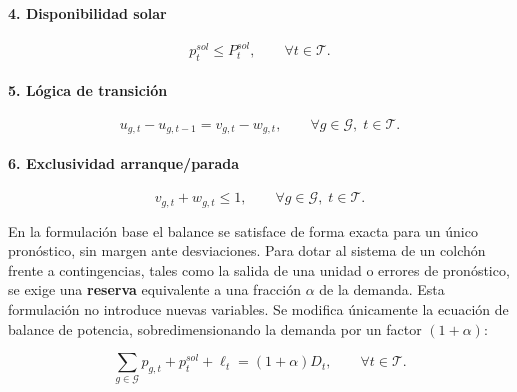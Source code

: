 \documentclass[
	spanish, %
	letterpaper, oneside
]{article}
\begin{document}
\paragraph{4. Disponibilidad solar}

\begin{equation}
    p^{sol}_t
    \leq
    P^{sol}_t,
    \qquad 
    \forall t\in\mathcal{T}.
    \label{eq:disponibilidad_solar_determinista}
\end{equation}

\paragraph{5. Lógica de transición}

\begin{equation}
    u_{g,t}-u_{g,t-1}
    =
    v_{g,t}-w_{g,t},
    \qquad 
    \forall g\in\mathcal{G},\; t\in\mathcal{T}.
    \label{eq:logica_transicion_determinista}
\end{equation}

\paragraph{6. Exclusividad arranque/parada}

\begin{equation}
    v_{g,t}+w_{g,t}
    \leq
    1,
    \qquad 
    \forall g\in\mathcal{G},\; t\in\mathcal{T}.
    \label{eq:exclusividad_arranque_parada_determinista}
\end{equation}

En la formulación base el balance se satisface de forma exacta para un único pronóstico, sin margen ante desviaciones. Para dotar al sistema de un colchón frente 
a contingencias, tales como la salida de una unidad o errores de pronóstico, se exige una \textbf{reserva} equivalente a una fracción $\alpha$ de la demanda. Esta formulación no introduce nuevas variables. Se modifica únicamente la ecuación 
de balance de potencia, sobredimensionando la demanda por un factor $(1+\alpha)$:

\begin{equation}
    \sum_{g\in\mathcal{G}} p_{g,t}
    +
    p^{sol}_t
    +
    \ell_t
    =
    (1+\alpha)D_t,
    \qquad 
    \forall t\in\mathcal{T}.
    \label{eq:balance_potencia_reserva_implicita}
\end{equation}
\end{document}
